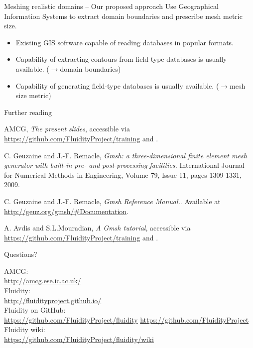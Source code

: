 \documentclass[t]{beamer}
\begin{document}
\begin{frame}{Meshing realistic domains -- Our proposed approach}
Use Geographical Information Systems to extract domain boundaries and prescribe mesh metric size.
\begin{itemize}
   \item Existing GIS software capable of reading databases in popular formats.
   \item Capability of extracting contours from field-type databases is usually available. ($\rightarrow$domain boundaries)
   \item Capability of generating field-type databases is usually available. ($\rightarrow$mesh size metric)
\end{itemize}
\end{frame}

\begin{frame}{Further reading}
\begin{thebibliography}{9}

  AMCG, 
  \emph{The present slides},
  accessible via \href{GitHub}{https://github.com/FluidityProject/training} and \href{Figshare}{}.

  C. Geuzaine and J.-F. Remacle,
  \emph{Gmsh: a three-dimensional finite element mesh generator with built-in pre- and post-processing facilities.}
  International Journal for Numerical Methods in Engineering,
  Volume 79, Issue 11,
  pages 1309-1331, 2009.

  C. Geuzaine and J.-F. Remacle,
  \emph{Gmsh Reference Manual.}.
  Available at
  \url{http://geuz.org/gmsh/\#Documentation}.

  A. Avdis and S.L.Mouradian,
  \emph{A Gmsh tutorial},
  accessible via \href{GitHub}{https://github.com/FluidityProject/training} and \href{Figshare}{}.

  \end{thebibliography}

\end{frame}

\begin{frame}{Questions?}
\begin{center}
\vfill
AMCG:\\
\url{http://amcg.ese.ic.ac.uk/}\\[15pt]
Fluidity:\\
\url{http://fluidityproject.github.io/}\\[15pt]
Fluidity on GitHub:\\
\url{https://github.com/FluidityProject/fluidity}
\url{https://github.com/FluidityProject}\\[15pt]
Fluidity wiki:\\
\url{https://github.com/FluidityProject/fluidity/wiki}
\end{center}
\end{frame}
\end{document}
